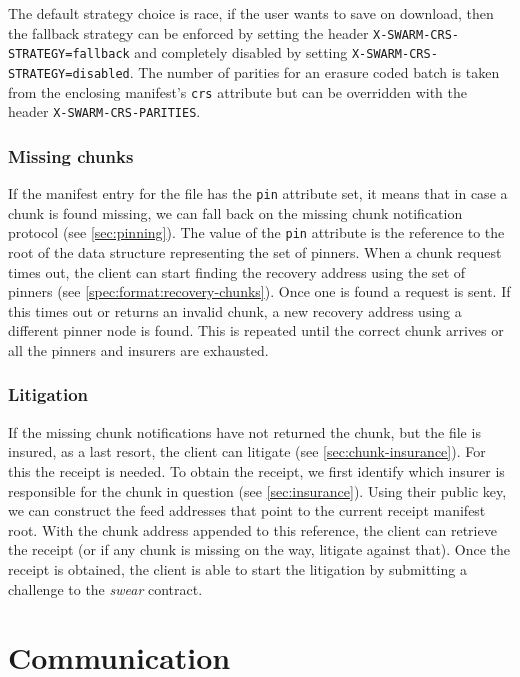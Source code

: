 The default strategy choice is race, if the user wants to save on download, then the fallback strategy can be enforced by setting the header \texttt{X-SWARM-CRS-STRATEGY=fallback} and completely disabled by setting \texttt{X-SWARM-CRS-STRATEGY=disabled}. The number of parities for an erasure coded batch is taken from the enclosing manifest's \texttt{crs} attribute but can be overridden with the header \texttt{X-SWARM-CRS-PARITIES}.

\subsubsection{Missing chunks}

If the manifest entry for the file has the \texttt{pin} attribute set, it means that in case a chunk is found missing, we can fall back on the missing chunk notification protocol (see \ref{sec:pinning}). The value of the \texttt{pin} attribute is the reference to the root of the data structure representing the set of pinners.
When a chunk request times out, the client can start finding  the recovery address using the set of pinners (see \ref{spec:format:recovery-chunks}). Once one is found a request is sent. If this times out or returns an invalid chunk, a new recovery address using a different pinner node is found. This is repeated until the correct chunk arrives or all the pinners and insurers are exhausted.

\subsubsection{Litigation}

If the missing chunk notifications have not returned the chunk, but the file is insured, as a last resort, the client can litigate (see \ref{sec:chunk-insurance}). For this the receipt is needed. To obtain the receipt, we first identify which insurer is responsible for  the chunk in question (see \ref{sec:insurance}). Using their public key, we can construct the feed addresses that point to the current receipt manifest root. With the chunk address appended to this reference, the client can retrieve the receipt (or if any chunk is missing on the way, litigate against that). Once the receipt is obtained, the client is able to start the litigation by submitting a challenge to the \emph{swear} contract.


\section{Communication}\label{sec:messaging}

